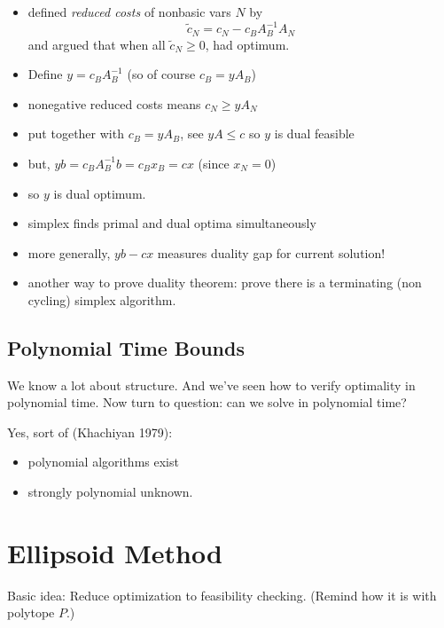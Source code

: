 \documentclass{article}
\begin{document}
\begin{itemize}
	\item defined {\em reduced costs} of nonbasic vars $N$ by 
	\[
	{\tilde c}_N = c_N-c_BA^{-1}_BA_N
	\]
	and argued that when all ${\tilde c}_N \ge 0$, had optimum.
	\item Define $y=c_BA^{-1}_B$ (so of course $c_B=yA_B$)
	\item nonegative reduced costs means $c_N \ge yA_N$
	\item put together with $c_B=yA_B$, see $yA \le c$ so $y$ is dual
	feasible
	\item but, $yb = c_B A^{-1}_B b = c_Bx_B=cx$ (since $x_N=0$)
	\item so $y$ is dual optimum.
	\item simplex finds primal and dual optima simultaneously
	\item more generally, $yb-cx$ measures duality gap for current solution!
	\item another way to prove duality theorem: prove there is a
	terminating (non cycling) simplex algorithm.
\end{itemize}



\subsection{Polynomial Time Bounds}

We know a lot about structure.  And we've seen how to verify
optimality in polynomial time.  Now turn to question: can we solve in
polynomial time?

Yes, sort of (Khachiyan 1979):
\begin{itemize}
	\item polynomial algorithms exist
	\item strongly polynomial unknown.
\end{itemize}




\section{Ellipsoid Method}

Basic idea: Reduce optimization to feasibility checking. (Remind how it is with polytope $P$.)
\end{document}
